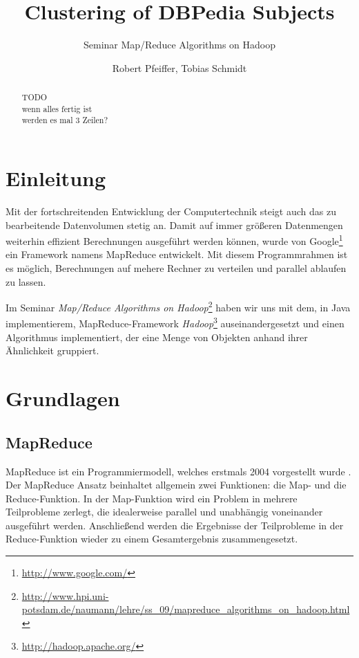 \documentclass[a4paper]{llncs}
\begin{document}
\title{Clustering of DBPedia Subjects}
\subtitle{Seminar Map/Reduce Algorithms on Hadoop}
\author{Robert Pfeiffer, Tobias Schmidt}

\maketitle

\begin{abstract}
TODO\\
wenn alles fertig ist\\
werden es mal 3 Zeilen?
\end{abstract}

\section{Einleitung}
Mit der fortschreitenden Entwicklung der Computertechnik steigt auch das zu bearbeitende Datenvolumen stetig an. Damit auf immer größeren Datenmengen weiterhin effizient Berechnungen ausgeführt werden können, wurde von Google\footnote{\url{http://www.google.com/}} ein Framework namens MapReduce entwickelt. Mit diesem Programmrahmen ist es möglich, Berechnungen auf mehere Rechner zu verteilen und parallel ablaufen zu lassen.

Im Seminar \emph{Map/Reduce Algorithms on Hadoop}\footnote{\url{http://www.hpi.uni-potsdam.de/naumann/lehre/ss_09/mapreduce_algorithms_on_hadoop.html}} haben wir uns mit dem, in Java implementierem, MapReduce-Framework \emph{Hadoop}\footnote{\url{http://hadoop.apache.org/}} auseinandergesetzt und einen Algorithmus implementiert, der eine Menge von Objekten anhand ihrer Ähnlichkeit gruppiert.

\section{Grundlagen}

\subsection{MapReduce}
MapReduce ist ein Programmiermodell, welches erstmals 2004 vorgestellt wurde \cite{DG04}.
Der MapReduce Ansatz beinhaltet allgemein zwei Funktionen: die Map- und die Reduce-Funktion. In der Map-Funktion wird ein Problem in mehrere Teilprobleme zerlegt, die idealerweise parallel und unabhängig voneinander ausgeführt werden.
Anschließend werden die Ergebnisse der Teilprobleme in der Reduce-Funktion wieder zu einem Gesamtergebnis zusammengesetzt.
\end{document}
